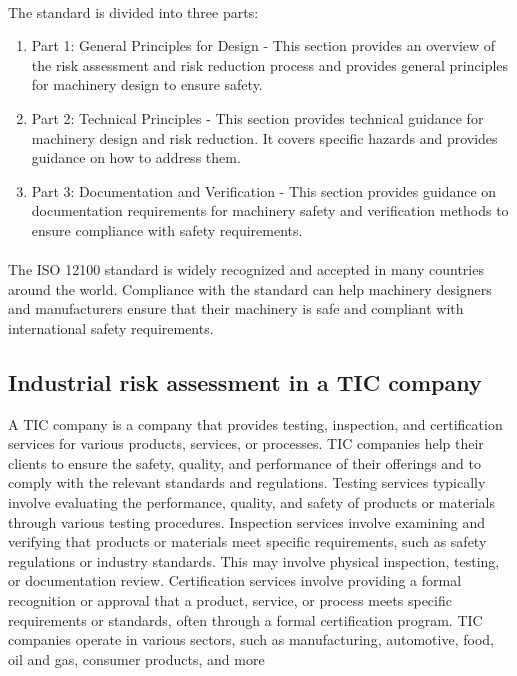 \paragraph{} The standard is divided into three parts:
\begin{enumerate}
    \item Part 1: General Principles for Design - This section provides an overview of the risk assessment and risk reduction process and provides general principles for machinery design to ensure safety.
    \item Part 2: Technical Principles - This section provides technical guidance for machinery design and risk reduction. It covers specific hazards and provides guidance on how to address them.
    \item Part 3: Documentation and Verification - This section provides guidance on documentation requirements for machinery safety and verification methods to ensure compliance with safety requirements.
\end{enumerate}

\paragraph{} The ISO 12100 standard is widely recognized and accepted in many countries around the world. Compliance with the standard can help machinery designers and manufacturers ensure that their machinery is safe and compliant with international safety requirements.

\subsection{Industrial risk assessment in a TIC company}

A TIC company is a company that provides testing, inspection, and certification services for various products, services, or processes. TIC companies help their clients to ensure the safety, quality, and performance of their offerings and to comply with the relevant standards and regulations. Testing services typically involve evaluating the performance, quality, and safety of products or materials through various testing procedures. Inspection services involve examining and verifying that products or materials meet specific requirements, such as safety regulations or industry standards. This may involve physical inspection, testing, or documentation review. Certification services involve providing a formal recognition or approval that a product, service, or process meets specific requirements or standards, often through a formal certification program. TIC companies operate in various sectors, such as manufacturing, automotive, food, oil and gas, consumer products, and more \cite{bcg}

